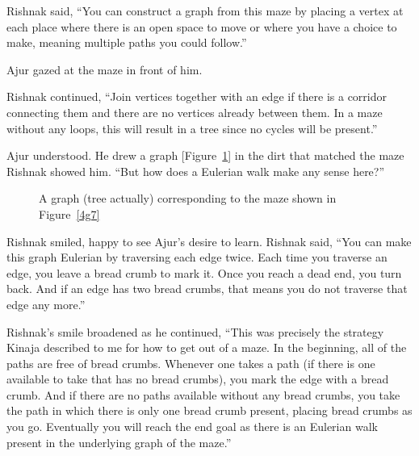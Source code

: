 Rishnak said, ``You can construct a graph from this maze by placing a vertex at each place where there is an open space to move or where you have a choice to make, meaning multiple paths you could follow.''

Ajur gazed at the maze in front of him.

Rishnak continued, ``Join vertices together with an edge if there is a corridor connecting them and there are no vertices already between them. In a maze without any loops, this will result in a tree since no cycles will be present.''

Ajur understood.  He drew a graph [Figure~\ref{4g8}] in the dirt that matched the maze Rishnak showed him.  ``But how does a Eulerian walk make any sense here?''

\begin{figure}
\begin{center}
\caption{A graph (tree actually) corresponding to the maze shown in Figure~\ref{4g7}}\label{4g8}
\end{center}
\end{figure}

Rishnak smiled, happy to see Ajur's desire to learn.  Rishnak said, ``You can make this graph Eulerian by traversing each edge twice. Each time you traverse an edge, you leave a bread crumb to mark it. Once you reach a dead end, you turn back. And if an edge has two bread crumbs, that means you do not traverse that edge any more.''

Rishnak's smile broadened as he continued, ``This was precisely the strategy Kinaja described to me for how to get out of a maze. In the beginning, all of the paths are free of bread crumbs. Whenever one takes a path (if there is one available to take that has no bread crumbs), you mark the edge with a bread crumb. And if there are no paths available without any bread crumbs, you take the path in which there is only one bread crumb present, placing bread crumbs as you go. Eventually you will reach the end goal as there is an Eulerian walk present in the underlying graph of the maze.''

